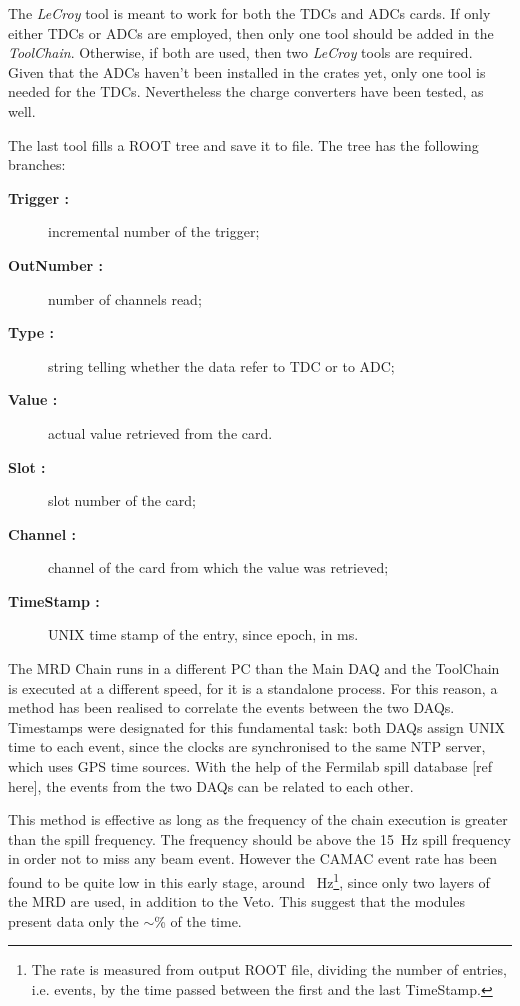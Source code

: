 The \emph{LeCroy} tool is meant to work for both the TDCs and ADCs cards.
If only either TDCs or ADCs are employed, then only one tool should be added in the \emph{ToolChain}.
Otherwise, if both are used, then two \emph{LeCroy} tools are required.
Given that the ADCs haven't been installed in the crates yet, only one tool is %
needed for the TDCs.
Nevertheless the charge converters have been tested, as well.

The last tool fills a ROOT tree and save it to file.
The tree has the following branches:
\begin{description}
  \item[\bfseries Trigger :] incremental number of the trigger;
  \item[\bfseries OutNumber :] number of channels read;
  \item[\bfseries Type :] string telling whether the data refer to TDC or to ADC;
  \item[\bfseries Value :] actual value retrieved from the card.
  \item[\bfseries Slot :] slot number of the card;
  \item[\bfseries Channel :] channel of the card from which the value was retrieved;
  \item[\bfseries TimeStamp :] UNIX time stamp of the entry, since epoch, in ms.
\end{description}

The MRD Chain runs in a different PC than the Main DAQ and the ToolChain %
is executed at a different speed, for it is a standalone process.
For this reason, a method has been realised to correlate the events between the two DAQs.
Timestamps were designated for this fundamental task: both DAQs assign UNIX time to each event, since %
the clocks are synchronised to the same NTP server, which uses GPS time sources.
With the help of the Fermilab spill database [ref here], the events from the two DAQs can be related %
to each other.

This method is effective as long as the frequency of the chain execution is greater than the %
spill frequency.
The frequency should be above the 15~Hz spill frequency in order not to miss any beam event.
However the CAMAC event rate has been found to be quite low in this %
early stage, around ~Hz\footnote{The rate is measured from output ROOT file, dividing %
  the number of entries, i.e. events, by the time passed between the first and the last TimeStamp.}, %
since only two layers of the MRD are used, in addition to the Veto.
This suggest that the modules present data only the $\sim$\% of the time.

